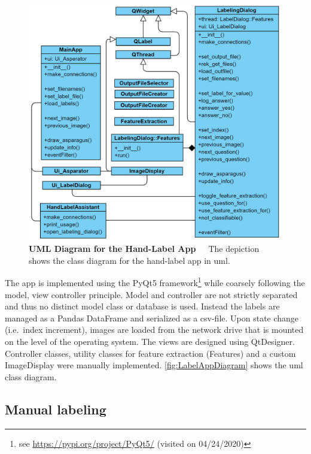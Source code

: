 \begin{figure}[!t]
    \centering
    \includegraphics[scale=0.3]{Figures/chapter03/label_app_diagram.png}
    \decoRule
    \caption[UML Diagram for the Hand-Label App]{\textbf{UML Diagram for the Hand-Label App}~~~The depiction shows the class diagram for the hand-label app in \acrshort{uml}.}
    \label{fig:LabelAppDiagram}
\end{figure}

The app is implemented using the PyQt5 framework\footnote{see \url{https://pypi.org/project/PyQt5/} (visited on 04/24/2020)} while coarsely following the model, view controller principle. Model and controller are not strictly separated and thus no distinct model class or database is used. Instead the labels are managed as a Pandas DataFrame and serialized as a csv-file. Upon state change (i.e.\ index increment), images are loaded from the network drive that is mounted on the level of the operating system. The views are designed using QtDesigner. Controller classes, utility classes for feature extraction (Features) and a custom ImageDisplay were manually implemented.  \autoref{fig:LabelAppDiagram} shows the \acrshort{uml} class diagram.


\subsection{Manual labeling}
\label{sec:ManualLabeling}

